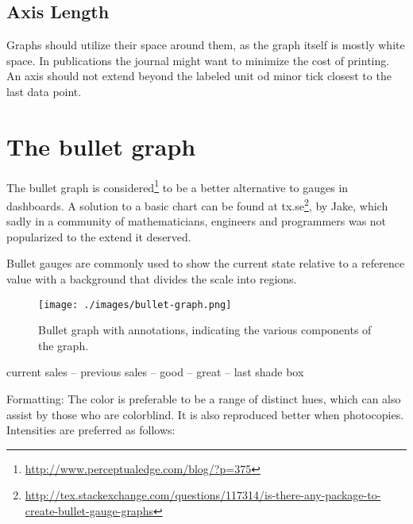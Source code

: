 \clearpage
\begin{multicols}{2}
\subsection{Axis Length}

Graphs should utilize their space around them, as the graph itself is mostly white space. In publications the journal might want to minimize the cost of printing. An axis should not extend beyond the labeled unit od minor tick closest to the last data point.
\columnbreak
{}
\end{multicols}


\section{The bullet graph}

The bullet graph is considered\footnote{\protect\url{http://www.perceptualedge.com/blog/?p=375}} to be a  better alternative to gauges in dashboards. A solution to a basic chart can be found at tx.se\footnote{\url{http://tex.stackexchange.com/questions/117314/is-there-any-package-to-create-bullet-gauge-graphs}}, by Jake, which sadly in a community of mathematicians, engineers and programmers was not popularized to the extend it deserved. 

Bullet gauges are commonly used to show the current state relative to a reference value with a background that divides the scale into regions.

\begin{figure}[htbp]
\centering

\texttt{[image: ./images/bullet-graph.png]}
\caption{Bullet graph with annotations, indicating the various components of the graph.}
\end{figure}



current sales --
previous sales --
good -- 
great -- last shade box

Formatting: The color is preferable to be a range of distinct hues, which can also assist by those who are colorblind. It is also reproduced better when photocopies.  Intensities are preferred as follows:

